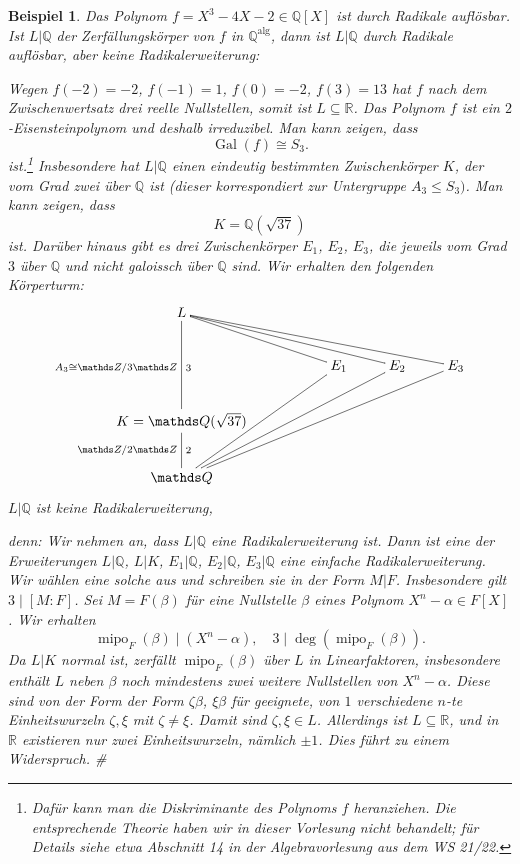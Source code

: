\documentclass[a4paper, twoside, 11pt, ngerman]{report}
\newcommand{\QQ}{\mathds Q}
\newcommand{\RR}{\mathds R}
\newcommand{\ZZ}{\mathds Z}
\DeclareMathOperator{\Gal}{Gal}
\DeclareMathOperator{\mipo}{mipo}
\theoremstyle{definistyle}
\newtheorem{bsp}[satz]{Beispiel}
\theoremstyle{remark}
\newenvironment{denn}%
  {\par\textit{denn:}}%
  {\hfill\#\par}
\begin{document}
\begin{bsp}
Das Polynom $f = X^3 - 4X - 2 \in \QQ[X]$ ist durch Radikale auflösbar. Ist $L|\QQ$
der Zerfällungskörper von $f$ in $\QQ^{\text{alg}}$, dann ist $L | \QQ$ durch Radikale auflösbar, aber keine Radikalerweiterung:

Wegen $f(-2) = -2$, $f(-1) = 1$, $f(0) = -2$, $f(3) = 13$ hat $f$ nach dem Zwischenwertsatz drei reelle Nullstellen, somit ist $L\subseteq \RR$. Das Polynom $f$ ist ein $2$-Eisensteinpolynom und deshalb irreduzibel. Man kann zeigen, dass 
\[
\Gal(f) \cong S_3.
\]
ist.\footnote{Dafür kann man die Diskriminante des Polynoms $f$ heranziehen. Die entsprechende Theorie haben wir in dieser Vorlesung nicht behandelt; für Details siehe etwa 
Abschnitt 14 in der Algebravorlesung aus dem WS 21/22.} Insbesondere hat $L|\QQ$ einen eindeutig bestimmten Zwischenkörper $K$, der vom Grad zwei über $\QQ$ ist (dieser korrespondiert zur Untergruppe $A_3\leq S_3)$. Man kann zeigen, dass
\[
K = \QQ(\sqrt{37})
\]
ist. Darüber hinaus gibt es drei Zwischenkörper $E_1$, $E_2$, $E_3$, die jeweils vom Grad $3$ über $\QQ$ und nicht galoissch
über $\QQ$ sind. Wir erhalten den folgenden 
Körperturm:
\[
\xymatrix{
    L \ar@{-}[dd]_{A_3\cong\ZZ/3\ZZ}^3 \ar@{-}[drr] \ar@{-}[drrr] \ar@{-}[drrrr] \\
    &  & E_1 \ar@{-}[ddll] & E_2 \ar@{-}[ddlll] & E_3 \ar@{-}[ddllll]\\
    K = \QQ(\sqrt{37}) \ar@{-}[d]_{\ZZ / 2\ZZ}^2 &\\
    \QQ & 
}
\]
$L | \QQ$ ist keine Radikalerweiterung, 
\begin{denn}
Wir nehmen an, dass $L | \QQ$ eine Radikalerweiterung ist. 
Dann ist eine der Erweiterungen $L|\QQ$, $L|K$, $E_1|\QQ$, $E_2|\QQ$, $E_3|\QQ$ eine einfache Radikalerweiterung.
Wir wählen eine solche aus und schreiben sie in der Form $M|F$. Insbesondere gilt $3\mid [M:F]$. Sei $M=F(\beta)$ für eine Nullstelle $\beta$ eines Polynom $X^n - \alpha \in F[X]$. Wir erhalten
\[
\mipo_F(\beta) \mid (X^n - \alpha), \quad 3\mid \deg(\mipo_F(\beta)).
\]
Da $L|K$ normal ist, zerfällt $\mipo_F(\beta)$ über $L$ in Linearfaktoren, insbesondere
enthält $L$ neben $\beta$ noch mindestens zwei weitere Nullstellen von $X^n-\alpha$. Diese sind von der Form
der Form $\zeta \beta$, $\xi \beta$ für geeignete, von $1$ verschiedene $n$-te Einheitswurzeln $\zeta, \xi$ mit $\zeta \neq \xi$. Damit sind $\zeta,\xi\in L$.
Allerdings ist $L \subseteq \RR$, und in $\RR$ existieren nur zwei Einheitswurzeln, nämlich $\pm 1$. Dies führt zu einem Widerspruch.
\end{denn}

\end{bsp}
\end{document}
